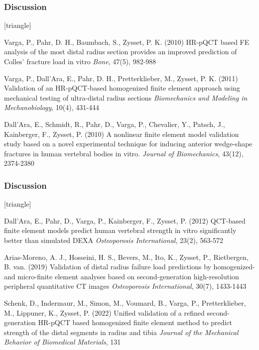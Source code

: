 \documentclass[xcolor=table,11pt]{beamer}
\begin{document}
	\begin{frame}
		\frametitle{Discussion}
		\footnotesize{
				\begin{thebibliography}{99}
						[triangle]

						 Varga, P., Pahr, D. H., Baumbach, S., Zysset, P. K. (2010)
						\newblock HR-pQCT based FE analysis of the most distal radius section provides an improved prediction of Colles' fracture load in vitro
						\newblock \textit{Bone}, 47(5), 982-988

						 Varga, P., Dall'Ara, E., Pahr, D. H., Pretterklieber, M., Zysset, P. K. (2011)
						\newblock Validation of an HR-pQCT-based homogenized finite element approach using mechanical testing of ultra-distal radius sections
						\newblock \textit{Biomechanics and Modeling in Mechanobiology}, 10(4), 431-444

						 Dall'Ara, E., Schmidt, R., Pahr, D., Varga, P., Chevalier, Y., Patsch, J., Kainberger, F., Zysset, P. (2010)
						\newblock A nonlinear finite element model validation study based on a novel experimental technique for inducing anterior wedge-shape fractures in human vertebral bodies in vitro.
						\newblock \textit{Journal of Biomechanics}, 43(12), 2374-2380
						
					\end{thebibliography}
			}
	\end{frame}

	\begin{frame}
		\frametitle{Discussion}
		\footnotesize{
				\begin{thebibliography}{99}
						\setbeamertemplate{bibliography item}[triangle]

						 Dall'Ara, E., Pahr, D., Varga, P., Kainberger, F., Zysset, P. (2012)
						\newblock QCT-based finite element models predict human vertebral strength in vitro significantly better than simulated DEXA
						\newblock \textit{Osteoporosis International}, 23(2), 563-572

						 Arias-Moreno, A. J., Hosseini, H. S., Bevers, M., Ito, K., Zysset, P., Rietbergen, B. van. (2019)
						\newblock Validation of distal radius failure load predictions by homogenized- and micro-finite element analyses based on second-generation high-resolution peripheral quantitative CT images
						\newblock \textit{Osteoporosis International}, 30(7), 1433-1443

						Schenk, D., Indermaur, M., Simon, M., Voumard, B., Varga, P., Pretterklieber, M., Lippuner, K., Zysset, P. (2022)
						\newblock Unified validation of a refined second-generation HR-pQCT based homogenized finite element method to predict strength of the distal segments in radius and tibia
						\newblock \textit{Journal of the Mechanical Behavior of Biomedical Materials}, 131

						
					\end{thebibliography}
			}
	\end{frame}
	
	
\end{document}
